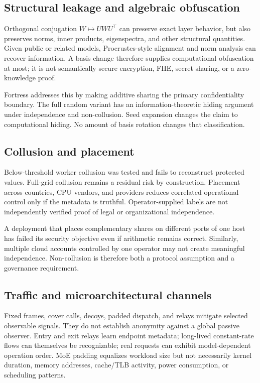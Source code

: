 \subsection{Structural leakage and algebraic obfuscation}

Orthogonal conjugation $W\mapsto UWU^{\top}$ can preserve exact layer behavior, but also preserves norms, inner products, eigenspectra, and other structural quantities. Given public or related models, Procrustes-style alignment and norm analysis can recover information. A basis change therefore supplies computational obfuscation at most; it is not semantically secure encryption, FHE, secret sharing, or a zero-knowledge proof.

Fortress addresses this by making additive sharing the primary confidentiality boundary. The full random variant has an information-theoretic hiding argument under independence and non-collusion. Seed expansion changes the claim to computational hiding. No amount of basis rotation changes that classification.

\subsection{Collusion and placement}

Below-threshold worker collusion was tested and fails to reconstruct protected values. Full-grid collusion remains a residual risk by construction. Placement across countries, CPU vendors, and providers reduces correlated operational control only if the metadata is truthful. Operator-supplied labels are not independently verified proof of legal or organizational independence.

A deployment that places complementary shares on different ports of one host has failed its security objective even if arithmetic remains correct. Similarly, multiple cloud accounts controlled by one operator may not create meaningful independence. Non-collusion is therefore both a protocol assumption and a governance requirement.

\subsection{Traffic and microarchitectural channels}

Fixed frames, cover calls, decoys, padded dispatch, and relays mitigate selected observable signals. They do not establish anonymity against a global passive observer. Entry and exit relays learn endpoint metadata; long-lived constant-rate flows can themselves be recognizable; real requests can exhibit model-dependent operation order. MoE padding equalizes workload size but not necessarily kernel duration, memory addresses, cache/TLB activity, power consumption, or scheduling patterns.

